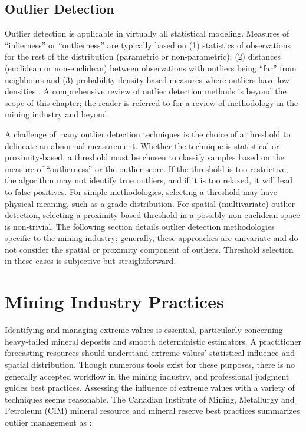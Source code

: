 \subsection{Outlier Detection}
\label{subsec:02dectection}

Outlier detection is applicable in virtually all statistical modeling. Measures of ``inlierness'' or ``outlierness'' are typically based on (1) statistics of observations for the rest of the distribution (parametric or non-parametric); (2) distances (euclidean or non-euclidean) between observations with outliers being ``far'' from neighbours and (3) probability density-based measures where outliers have low densities \citep{li2022ecod}. A comprehensive review of outlier detection methods is beyond the scope of this chapter; the reader is referred to \cite{aggarwal2016outlier,pang2022deep,hodge2004survey,wang2019progress,nowak2019optimal,leuangthong2015dealing} for a review of methodology in the mining industry and beyond.

A challenge of many outlier detection techniques is the choice of a threshold to delineate an abnormal measurement. Whether the technique is statistical or proximity-based, a threshold must be chosen to classify samples based on the measure of ``outlierness'' or the outlier score. If the threshold is too restrictive, the algorithm may not identify true outliers, and if it is too relaxed, it will lead to false positives. For simple methodologies, selecting a threshold may have physical meaning, such as a grade distribution. For spatial (multivariate) outlier detection, selecting a proximity-based threshold in a possibly non-euclidean space is non-trivial. The following section details outlier detection methodologies specific to the mining industry; generally, these approaches are univariate and do not consider the spatial or proximity component of outliers. Threshold selection in these cases is subjective but straightforward.

\FloatBarrier
\section{Mining Industry Practices}
\label{sec:02industry}

Identifying and managing extreme values is essential, particularly concerning heavy-tailed mineral deposits and smooth deterministic estimators. A practitioner forecasting resources should understand extreme values' statistical influence and spatial distribution. Though numerous tools exist for these purposes, there is no generally accepted workflow in the mining industry, and professional judgment guides best practices. Assessing the influence of extreme values with a variety of techniques seems reasonable. The Canadian Institute of Mining, Metallurgy and Petroleum (CIM) mineral resource and mineral reserve best practices summarizes outlier management as \citep{cim2019}:

